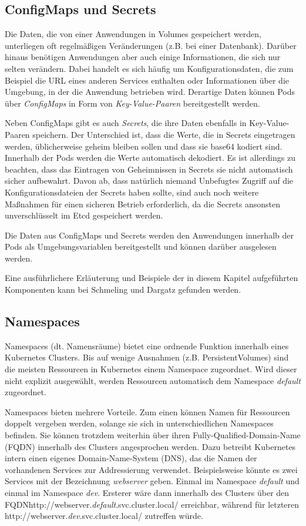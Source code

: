 \documentclass[11pt,a4paper]{article}
\begin{document}
\subsection{ConfigMaps und Secrets}
Die Daten, die von einer Anwendungen in Volumes gespeichert werden, unterliegen oft regelmäßigen Veränderungen
(z.B. bei einer Datenbank). Darüber hinaus benötigen Anwendungen aber auch einige Informationen, die sich nur 
selten verändern. Dabei handelt es sich häufig um Konfigurationsdaten, die zum Beispiel die URL eines anderen
Services enthalten oder Informationen über die Umgebung, in der die Anwendung betrieben wird.
Derartige Daten können Pods über \emph{ConfigMaps} in Form von \emph{Key-Value-Paaren} bereitgestellt werden.

Neben ConfigMaps gibt es auch \emph{Secrets}, die ihre Daten ebenfalls in Key-Value-Paaren speichern.
Der Unterschied ist, dass die Werte, die in Secrets eingetragen werden, üblicherweise geheim bleiben sollen und
dass sie base64 kodiert sind. Innerhalb der Pods werden die Werte automatisch dekodiert.
Es ist allerdings zu beachten, dass das Eintragen von Geheimnissen in Secrets sie nicht automatisch sicher
aufbewahrt. Davon ab, dass natürlich niemand Unbefugtes Zugriff auf die Konfigurationsdateien der Secrets haben sollte,
sind auch noch weitere Maßnahmen für einen sicheren Betrieb erforderlich, da die Secrets ansonsten
unverschlüsselt im Etcd gespeichert werden.

Die Daten aus ConfigMaps und Secrets werden den Anwendungen innerhalb der Pods als Umgebungsvariablen
bereitgestellt und können darüber ausgelesen werden.

Eine ausführlichere Erläuterung und Beispiele der in diesem Kapitel aufgeführten Komponenten 
kann bei Schmeling und Dargatz \cite{Schmeling_Dargatz_2022} gefunden werden.

\subsection{Namespaces}
Namespaces (dt. Namensräume) bietet eine ordnende Funktion innerhalb eines Kubernetes Clusters.
Bis auf wenige Ausnahmen (z.B. PersistentVolumes) sind die meisten Ressourcen in Kubernetes einem 
Namespace zugeordnet. Wird dieser nicht explizit ausgewählt, werden Ressourcen automatisch dem 
Namespace \emph{default} zugeordnet.

Namespaces bieten mehrere Vorteile. Zum einen können Namen für Ressourcen doppelt vergeben werden,
solange sie sich in unterschiedlichen Namespaces befinden. Sie können trotzdem weiterhin
über ihren Fully-Qualified-Domain-Name (FQDN) innerhalb des Clusters angesprochen werden.
Dazu betreibt Kubernetes intern einen eigenes Domain-Name-System (DNS), das die Namen
der vorhandenen Services zur Addressierung verwendet.
Beispielsweise könnte es zwei Services mit der Bezeichnung \emph{webserver} geben.
Einmal im Namespace \emph{default} und einmal im Namespace \emph{dev}. 
Ersterer wäre dann innerhalb des Clusters über den FQDN\linebreak http://webserver.\emph{default}.svc.cluster.local/
erreichbar, während für letzteren http://webserver.\emph{dev}.svc.cluster.local/ zutreffen würde.
\end{document}
